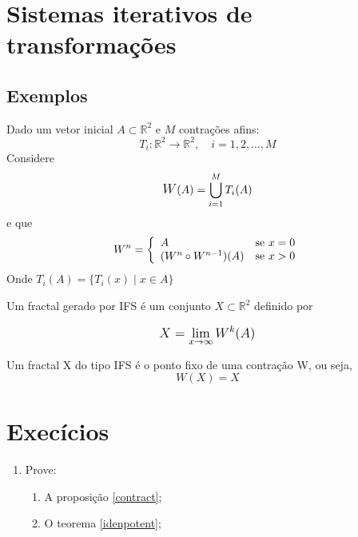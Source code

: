 \section{Sistemas iterativos de transformações}

\subsection{Exemplos}

Dado um vetor inicial \( A \subset \mathbb{R}^2 \) e \( M \) contrações afins:
\[ 
    T_i: \mathbb{R}^2 \longrightarrow \mathbb{R}^2, \quad i = 1,2,...,M 
\]
Considere
\begin{equation}
    \mathlarger W(A) = \bigcup_{i = 1}^{M} T_i(A)
\end{equation}
e que
\begin{equation}
    W^n =
    \left\{
    	\begin{array}{l l}
    		 A                         & \mbox{se } x = 0 \\
    		 (W^{n} \circ W^{n-1})(A)  & \mbox{se } x > 0
    	\end{array}
    \right.
\end{equation}
Onde \( T_i(A) = \{ T_i(x) \mid x \in A \} \)
\begin{definition}

Um fractal gerado por IFS é um conjunto \( X \subset  \mathbb{R}^2 \) definido por 

\[ 
    \mathlarger{
        X = \lim_{x \rightarrow{\infty}} W^k(A)
    }  
\]

\end{definition}

\begin{theorem}\label{idenpotent}
Um fractal X do tipo IFS é o ponto fixo de uma contração W, ou seja,
\[ 
    W(X) = X 
\] 

\end{theorem}

\section{Execícios}

\begin{enumerate}
    \item Prove:
        \begin{enumerate}
            \item A proposição \ref{contract};
            \item O teorema \ref{idenpotent};
        \end{enumerate}
    
\end{enumerate}
